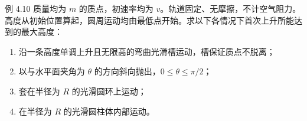 \begin{origexamplebox}{例 4.10}
质量均为 $m$ 的质点，初速率均为 $v$。轨道固定、无摩擦，不计空气阻力。
高度从初始位置算起，圆周运动均由最低点开始。求以下各情况下首次上升所能达到的最大高度：
\begin{enumerate}[label=\arabic*.,leftmargin=2.2em]
 \item 沿一条高度单调上升且无限高的弯曲光滑槽运动，槽保证质点不脱离；
 \item 以与水平面夹角为 $\theta$ 的方向斜向抛出，$0\le\theta\le\pi/2$；
 \item 套在半径为 $R$ 的光滑圆环上运动；
 \item 在半径为 $R$ 的光滑圆柱体内部运动。
\end{enumerate}
\probdiagFourTen
\end{origexamplebox}

